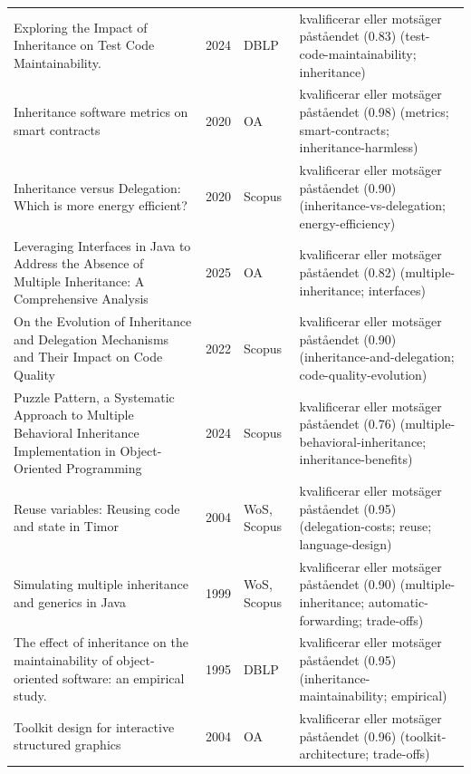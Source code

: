 \begin{longtable}{@{}%
  >{\raggedright\arraybackslash}p{}c%
  >{\raggedright\arraybackslash}p{}%
  >{\raggedright\arraybackslash}p{}@{}}
Exploring the Impact of Inheritance on Test Code Maintainability. & 2024 & DBLP & kvalificerar eller motsäger påståendet (0.83) (test-code-maintainability; inheritance) \\
Inheritance software metrics on smart contracts & 2020 & OA & kvalificerar eller motsäger påståendet (0.98) (metrics; smart-contracts; inheritance-harmless) \\
Inheritance versus Delegation: Which is more energy efficient? & 2020 & Scopus & kvalificerar eller motsäger påståendet (0.90) (inheritance-vs-delegation; energy-efficiency) \\
Leveraging Interfaces in Java to Address the Absence of Multiple Inheritance: A Comprehensive Analysis & 2025 & OA & kvalificerar eller motsäger påståendet (0.82) (multiple-inheritance; interfaces) \\
On the Evolution of Inheritance and Delegation Mechanisms and Their Impact on Code Quality & 2022 & Scopus & kvalificerar eller motsäger påståendet (0.90) (inheritance-and-delegation; code-quality-evolution) \\
Puzzle Pattern, a Systematic Approach to Multiple Behavioral Inheritance Implementation in Object-Oriented Programming & 2024 & Scopus & kvalificerar eller motsäger påståendet (0.76) (multiple-behavioral-inheritance; inheritance-benefits) \\
Reuse variables: Reusing code and state in Timor & 2004 & WoS, Scopus & kvalificerar eller motsäger påståendet (0.95) (delegation-costs; reuse; language-design) \\
Simulating multiple inheritance and generics in Java & 1999 & WoS, Scopus & kvalificerar eller motsäger påståendet (0.90) (multiple-inheritance; automatic-forwarding; trade-offs) \\
The effect of inheritance on the maintainability of object-oriented software: an empirical study. & 1995 & DBLP & kvalificerar eller motsäger påståendet (0.95) (inheritance-maintainability; empirical) \\
Toolkit design for interactive structured graphics & 2004 & OA & kvalificerar eller motsäger påståendet (0.96) (toolkit-architecture; trade-offs) \\
\end{longtable}
\endgroup

